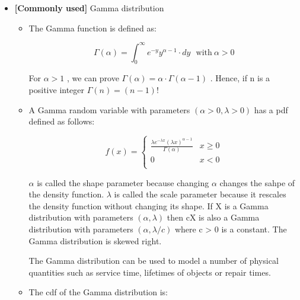 \documentclass[12pt]{report}
\renewcommand{\_}{\kern-1.5pt\textunderscore\kern-1.5pt}
\begin{document}
\begin{itemize}
	\item \textbf{[Commonly used] }Gamma distribution\par

\begin{itemize}
	\item The Gamma function is defined as:\par

 \[  \Gamma  \left(  \alpha  \right) = \int _{0}^{\infty}e^{-y}y^{ \alpha -1} \cdot dy~~~\mathrm{with~} \alpha >0 \] \par

For  \(  \alpha >1 \) , we can prove  \(  \Gamma  \left(  \alpha  \right) = \alpha  \cdot  \Gamma  \left(  \alpha -1 \right)  \) . Hence, if n is a positive integer  \(  \Gamma  \left( n \right) = \left( n-1 \right) ! \) \par

	\item A Gamma random variable with parameters  \(  \left(  \alpha >0,  \lambda >0 \right)  \)  has a pdf defined as follows:\par

 \[ f \left( x \right) = \left\{ \begin{matrix}
\frac{ \lambda e^{- \lambda x} \left(  \lambda x \right) ^{ \alpha -1}}{ \Gamma  \left(  \alpha  \right) }  &  x \geq 0\\
0  &  x<0\\
\end{matrix}
  \] \par

 \(  \alpha  \)  is called the shape parameter because changing  \(  \alpha  \)  changes the sahpe of the density function.  \(  \lambda  \)  is called the scale parameter because it rescales the density function without changing its shape. If X is a Gamma distribution with parameters  \(  \left(  \alpha ,  \lambda  \right)  \)  then cX is also a Gamma distribution with parameters  \(  \left(  \alpha ,  \lambda /c \right)  \)  where c > 0 is a constant. The Gamma distribution is skewed right. \par

The Gamma distribution can be used to model a number of physical quantities such as service time, lifetimes of objects or repair times. \par

	\item The cdf of the Gamma distribution is:\par


\end{itemize}
\end{itemize}
\end{document}
